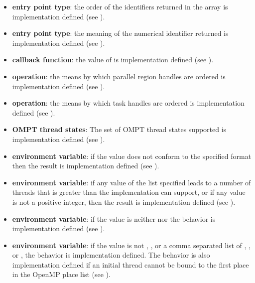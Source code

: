 \begin{itemize}
\item {} \textbf{entry point type}:
  the order of the identifiers returned in the array 
  is implementation defined (see
  ).

\item {} \textbf{entry point type}:
the meaning of the numerical identifier returned is implementation defined (see ).

\item {} \textbf{callback function}:
the value of  is implementation defined (see
).

\item {} \textbf{operation}:
the means by which parallel region handles are ordered is implementation defined (see ).

\item {} \textbf{operation}:
the means by which task handles are ordered is implementation defined (see
).

\item \textbf{OMPT thread states}: The set of OMPT thread states supported is implementation defined (see ).

\item {} \textbf{environment variable}: if the value does not
conform to the specified format then the result is implementation defined (see
).

\item {} \textbf{environment variable}: if any value of the list specified
leads to a number of threads that is
greater than the implementation can support, or if any value is not a positive integer,
then the result is implementation defined (see ).

\item {} \textbf{environment variable}: if the value is neither
 nor  the behavior is implementation defined (see
).

\item {} \textbf{environment variable}: if the value is not , , or a
comma separated list of , , or , the behavior is
implementation defined. The behavior is also implementation defined if an initial
thread cannot be bound to the first place in the OpenMP place list (see
).


\end{itemize}
